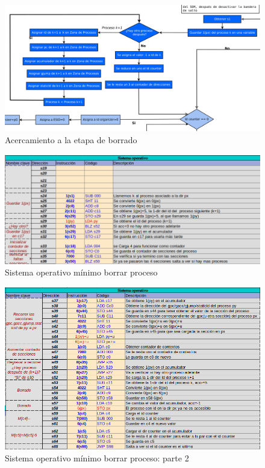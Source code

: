 \documentclass[letterpaper,12pt,oneside]{book}
\begin{document}
			
			\begin{figure}[H]		
				\centering
				\includegraphics[scale=0.32]{media/Paralela/diag_somp_erase.png}
				\caption{Acercamiento a la etapa de borrado}
				\label{fig:diag_somp_erase}
			\end{figure}	
			
			
			\begin{figure}[H]		
				\centering
				\includegraphics[scale=0.53]{media/Paralela/sop_erase1.png}
				\caption{Sistema operativo mínimo borrar proceso}
				\label{fig:sop_erase1}
			\end{figure}
			
			
			\begin{figure}[H]		
				\centering
				\includegraphics[scale=0.53]{media/Paralela/sop_erase2.png}
				\caption{Sistema operativo mínimo borrar proceso: parte 2}
				\label{fig:sop_erase2}
			\end{figure}
\end{document}
